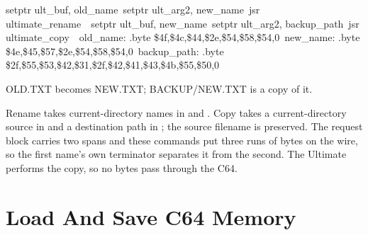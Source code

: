 \begin{listingbox}
\hspace*{2em}setptr ult\_buf, old\_name\
\hspace*{2em}setptr ult\_arg2, new\_name\
\hspace*{2em}jsr ultimate\_rename\
\
\hspace*{2em}setptr ult\_buf, new\_name\
\hspace*{2em}setptr ult\_arg2, backup\_path\
\hspace*{2em}jsr ultimate\_copy\
\
old\_name:  .byte \$4f,\$4c,\$44,\$2e,\$54,\$58,\$54,0\
new\_name:  .byte \$4e,\$45,\$57,\$2e,\$54,\$58,\$54,0\
backup\_path: .byte \$2f,\$55,\$53,\$42,\$31,\$2f,\$42,\$41,\$43,\$4b,\$55,\$50,0
\end{listingbox}

\begin{resultbox}
OLD.TXT becomes NEW.TXT; BACKUP/NEW.TXT is a copy of it.
\end{resultbox}

Rename takes current-directory names in  and .
Copy takes a current-directory source in \cmd{ult\_buf} and a destination path
in \cmd{ult\_arg2}; the source filename is preserved.
The request block carries two spans and these commands put three runs of bytes
on the wire, so the first name's own terminator separates it from the second.
The Ultimate performs the copy, so no bytes pass through the C64.


\section{Load And Save C64 Memory}

